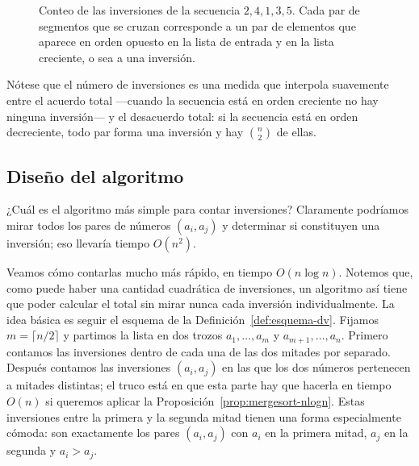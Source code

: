 \documentclass[12pt, spanish, oneside, openany]{book}
\theoremstyle{uprightplain}
\theoremstyle{definition}
\theoremstyle{remark}
\theoremstyle{definition}
\begin{document}
\begin{figure}[H]
\centering
{}
\caption{Conteo de las inversiones de la secuencia $2,4,1,3,5$. Cada par de
segmentos que se cruzan corresponde a un par de elementos que aparece en orden
opuesto en la lista de entrada y en la lista creciente, o sea a una inversión.}
\label{fig:inversiones}
\end{figure}

Nótese que el número de inversiones es una medida que interpola suavemente entre el acuerdo total ---cuando la secuencia está en orden creciente no hay ninguna inversión--- y el desacuerdo total: si la secuencia está en orden decreciente, todo par forma una inversión y hay $\binom{n}{2}$ de ellas.

\subsection{Diseño del algoritmo}

¿Cuál es el algoritmo más simple para contar inversiones? Claramente podríamos mirar todos los pares de números $(a_i,a_j)$ y determinar si constituyen una inversión; eso llevaría tiempo $O(n^2)$.

Veamos cómo contarlas mucho más rápido, en tiempo $O(n\log n)$. Notemos que, como puede haber una cantidad cuadrática de inversiones, un algoritmo así tiene que poder calcular el total sin mirar nunca cada inversión individualmente. La idea básica es seguir el esquema de la Definición~\ref{def:esquema-dv}. Fijamos $m=\lceil n/2\rceil$ y partimos la lista en dos trozos $a_1,\dots,a_m$ y $a_{m+1},\dots,a_n$. Primero contamos las inversiones dentro de cada una de las dos mitades por separado. Después contamos las inversiones $(a_i,a_j)$ en las que los dos números pertenecen a mitades distintas; el truco está en que esta parte hay que hacerla en tiempo $O(n)$ si queremos aplicar la Proposición~\ref{prop:mergesort-nlogn}. Estas inversiones entre la primera y la segunda mitad tienen una forma especialmente cómoda: son exactamente los pares $(a_i,a_j)$ con $a_i$ en la primera mitad, $a_j$ en la segunda y $a_i>a_j$.
\end{document}
